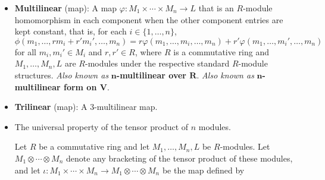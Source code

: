 \documentclass[../notes.tex]{subfiles}
\begin{document}
\begin{itemize}
\begin{theorem}
        Suppose $M$ is a right $R$-module, $N$ is an $(R,T)$-bimodule, and $L$ is a left $T$-module. Then there is a unique isomorphism
        \begin{equation*}
            (M\otimes_RN)\otimes_TL \cong M\otimes_R(N\otimes_TL)
        \end{equation*}
        of abelian groups such that $(m\otimes n)\otimes l\mapsto m\otimes(n\otimes l)$. If $M$ is an $(S,R)$-bimodule, then this is an isomorphism of $S$-modules.
        \begin{proof}
            Given.
        \end{proof}
    \end{theorem}
    \begin{corollary}\label{cly:10.15}
        Suppose $R$ is commutative and $M,N,L$ are $R$-modules. Then
        \begin{equation*}
            (M\otimes N)\otimes L \cong M\otimes(N\otimes L)
        \end{equation*}
        as $R$-modules for the standard $R$-module structures on $M,N,L$.
    \end{corollary}
    \item \textbf{Multilinear} (map): A map $\varphi:M_1\times\cdots\times M_n\to L$ that is an $R$-module homomorphism in each component when the other component entries are kept constant, that is, for each $i\in\{1,\dots,n\}$,
    \begin{equation*}
        \phi(m_1,\dots,rm_i+r'm_i',\dots,m_n) = r\varphi(m_1,\dots,m_i,\dots,m_n)+r'\varphi(m_1,\dots,m_i',\dots,m_n)
    \end{equation*}
    for all $m_i,m_i'\in M_i$ and $r,r'\in R$, where $R$ is a commutative ring and $M_1,\dots,M_n,L$ are $R$-modules under the respective standard $R$-module structures. \emph{Also known as} \textbf{$\bm{n}$-multilinear over $\bm{R}$}. \emph{Also known as} \textbf{$\bm{n}$-multilinear form on $\bm{V}$}.
    \item \textbf{Trilinear} (map): A 3-multilinear map.
    \item The universal property of the tensor product of $n$ modules.
    \begin{corollary}\label{cly:10.16}
        Let $R$ be a commutative ring and let $M_1,\dots,M_n,L$ be $R$-modules. Let $M_1\otimes\cdots\otimes M_n$ denote any bracketing of the tensor product of these modules, and let $\iota:M_1\times\cdots\times M_n\to M_1\otimes\cdots\otimes M_n$ be the map defined by
        \begin{equation*}

\end{equation*}
\end{corollary}
\end{itemize}
\end{document}

